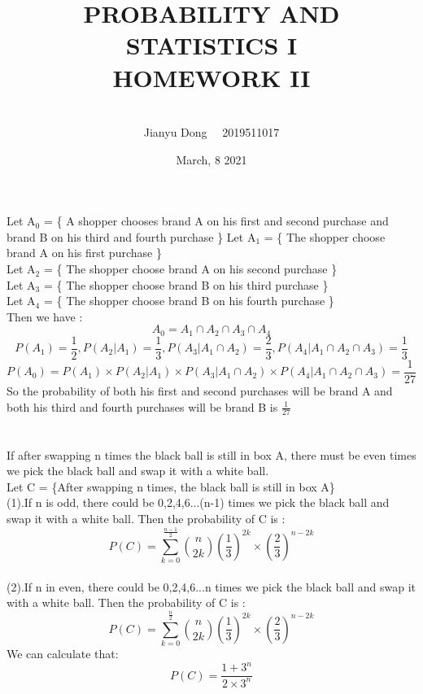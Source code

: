 \documentclass[10.5pt]{article}
\title{PROBABILITY AND STATISTICS I
\\HOMEWORK II}
\author{\\Jianyu Dong   ~~2019511017}
\date{March, 8 2021}
\begin{document}
\maketitle
\newpage
\section{}
Let A$_{0}$ = \{ A shopper chooses brand A on his first and second purchase and brand B on his third and fourth purchase \} 
\newline
\indent
Let A$_{1}$ = \{ The shopper choose brand A on his first purchase \}\\
\indent
Let A$_{2}$ = \{ The shopper choose brand A on his second purchase \}\\
\indent
Let A$_{3}$ = \{ The shopper choose brand B on his third purchase \}\\
\indent
Let A$_{4}$ = \{ The shopper choose brand B on his fourth purchase \}\\
\indent
Then we have :
\begin{equation*}
    A_0 = A_1\cap A_2\cap A_3\cap A_4
\end{equation*}
\begin{equation*}
    P(A_1) = \frac{1}{2},
    P(A_2|A_1) = \frac{1}{3},
    P(A_3|A_1\cap A_2) = \frac{2}{3},
    P(A_4|A_1\cap A_2\cap A_3) = \frac{1}{3}
\end{equation*}
\begin{equation*}
    P(A_0) = P(A_1)\times P(A_2|A_1)\times P(A_3|A_1\cap A_2)\times P(A_4|A_1\cap A_2\cap A_3) = \frac{1}{27}
\end{equation*}
\indent
So the probability of both his first and second purchases will be brand A and both his third and fourth purchases will be brand B is $\frac{1}{27}$


\section{}
If after swapping n times the black ball is still in box A, there must be even times we pick the black ball and swap it with a white ball.\\
\indent
Let C = \{After swapping n times, the black ball is still in box A\}\\
\indent
(1).If n is odd, there could be 0,2,4,6...(n-1) times we pick the black ball and swap it with a white ball. Then the probability of C is :\\
\begin{equation*}
    P(C) = \sum_{k=0}^\frac{n-1}{2}\binom{n}{2k} (\frac{1}{3})^{2k}\times (\frac{2}{3})^{n-2k}
\end{equation*}\\ 
\indent
(2).If n in even, there could be 0,2,4,6...n times we pick the black ball and swap it with a white ball. Then the probability of C is :\\
\begin{equation*}
    P(C) = \sum_{k=0}^\frac{n}{2}\binom{n}{2k} (\frac{1}{3})^{2k}\times (\frac{2}{3})^{n-2k}
\end{equation*}
\indent
We can calculate that:$$P(C) = \frac{1+3^n}{2\times 3^n}$$
\end{document}
